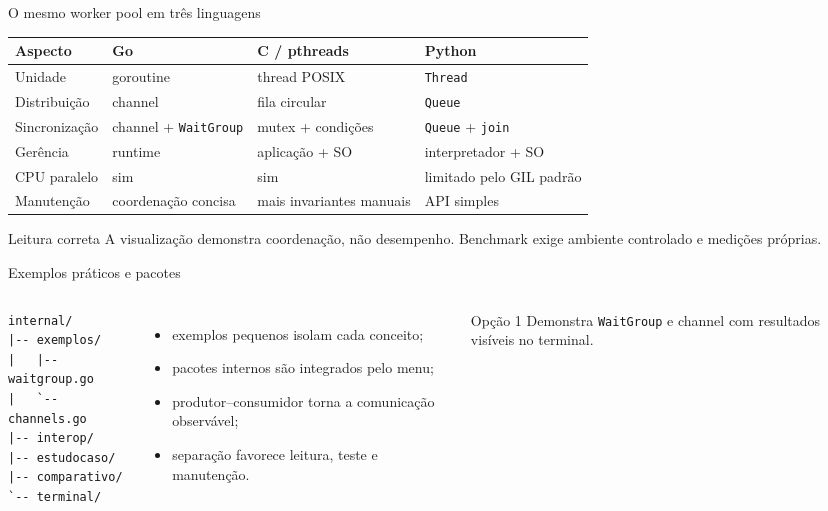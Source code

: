 \documentclass[aspectratio=169,11pt]{beamer}
\begin{document}
\begin{frame}{O mesmo worker pool em três linguagens}
  \small
  \begin{tabular}{@{}p{2.3cm}p{2.7cm}p{3.0cm}p{3.0cm}@{}}
    \toprule
    \textbf{Aspecto} & \textbf{Go} & \textbf{C / pthreads} & \textbf{Python} \\
    \midrule
    Unidade & goroutine & thread POSIX & \texttt{Thread} \\
    Distribuição & channel & fila circular & \texttt{Queue} \\
    Sincronização & channel + \texttt{WaitGroup} & mutex + condições & \texttt{Queue} + \texttt{join} \\
    Gerência & runtime & aplicação + SO & interpretador + SO \\
    CPU paralelo & sim & sim & limitado pelo GIL padrão \\
    Manutenção & coordenação concisa & mais invariantes manuais & API simples \\
    \bottomrule
  \end{tabular}
  \begin{alertblock}{Leitura correta}
    A visualização demonstra coordenação, não desempenho. Benchmark exige ambiente controlado e medições próprias.
  \end{alertblock}
\end{frame}

\begin{frame}[fragile]{Exemplos práticos e pacotes}
  \begin{columns}[T]
\begin{lstlisting}[style=terminal]
internal/
|-- exemplos/
|   |-- waitgroup.go
|   `-- channels.go
|-- interop/
|-- estudocaso/
|-- comparativo/
`-- terminal/
\end{lstlisting}
      \begin{itemize}
        \item exemplos pequenos isolam cada conceito;
        \item pacotes internos são integrados pelo menu;
        \item produtor--consumidor torna a comunicação observável;
        \item separação favorece leitura, teste e manutenção.
      \end{itemize}
      \begin{block}{Opção 1}
        Demonstra \texttt{WaitGroup} e channel com resultados visíveis no terminal.
      \end{block}
  \end{columns}
\end{frame}
\end{document}
